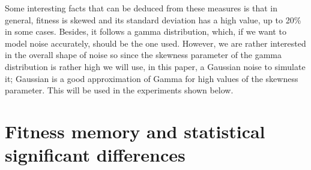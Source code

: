 \documentclass{llncs}
\begin{document}
Some interesting facts that can be deduced from these measures is that
in general, fitness is skewed and its standard deviation has a high
value, up to 20\% in some cases. Besides, it
follows a gamma distribution, which, if we want to model noise
accurately, should be the one used. However, we are rather interested
in the overall shape of noise so since the skewness parameter of the gamma
distribution is rather high we will use, in this paper, a Gaussian
noise to simulate it; Gaussian is a good approximation of Gamma for
high values of the skewness parameter. This will be used in the experiments shown
below. 


\section{Fitness memory and statistical significant differences}
\label{sec:wilcoxon}
\end{document}
